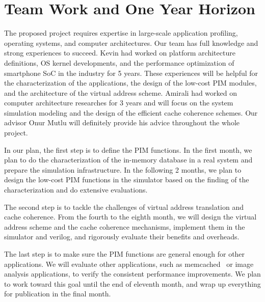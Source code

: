 \section{Team Work and One Year Horizon}
The proposed project requires expertise in large-scale application profiling, operating systems, and computer architectures. Our team has full knowledge and strong experiences to succeed. Kevin had worked on platform architecture definitions, OS kernel developments, and the performance optimization of smartphone SoC in the industry for 5 years. These experiences will be helpful for the characterization of the applications, the design of the low-cost PIM modules, and the architecture of the virtual address scheme. Amirali had worked on computer architecture researches for 3 years and will focus on the system simulation modeling and the design of the efficient cache coherence schemes. Our advisor Onur Mutlu will definitely provide his advice throughout the whole project. 

In our plan, the first step is to define the PIM functions. In the first month, we plan to do the characterization of the in-memory database in a real system and prepare the simulation infrastructure. In the following 2 months, we plan to design the low-cost PIM functions in the simulator based on the finding of the characterization and do extensive evaluations.

The second step is to tackle the challenges of virtual address translation and cache coherence. From the fourth to the eighth month, we will design the virtual address scheme and the cache coherence mechanisms, implement them in the simulator and verilog, and rigorously evaluate their benefits and overheads.

The last step is to make sure the PIM functions are general enough for other applications. We will evaluate other applications, such as memcached~\cite{fitzpatrick2004distributed} or image analysis applications, to verify the consistent performance improvements. We plan to work toward this goal until the end of eleventh month, and wrap up everything for publication in the final month.
